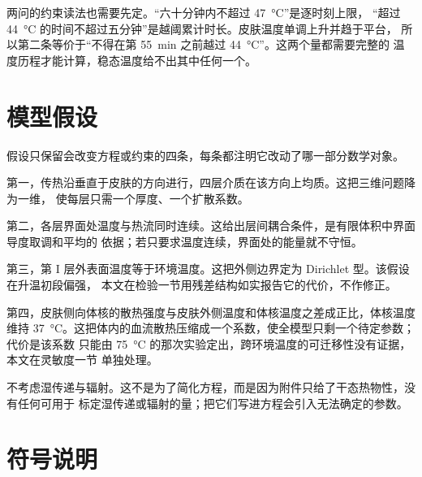 \documentclass[withoutpreface,bwprint]{cumcmthesis}
\begin{document}
两问的约束读法也需要先定。“六十分钟内不超过 \SI{47}{\celsius}”是逐时刻上限，
“超过 \SI{44}{\celsius} 的时间不超过五分钟”是越阈累计时长。皮肤温度单调上升并趋于平台，
所以第二条等价于“不得在第 \SI{55}{min} 之前越过 \SI{44}{\celsius}”。这两个量都需要完整的
温度历程才能计算，稳态温度给不出其中任何一个。

\section{模型假设}

假设只保留会改变方程或约束的四条，每条都注明它改动了哪一部分数学对象。

第一，传热沿垂直于皮肤的方向进行，四层介质在该方向上均质。这把三维问题降为一维，
使每层只需一个厚度、一个扩散系数。

第二，各层界面处温度与热流同时连续。这给出层间耦合条件，是有限体积中界面导度取调和平均的
依据；若只要求温度连续，界面处的能量就不守恒。

第三，第 I 层外表面温度等于环境温度。这把外侧边界定为 Dirichlet 型。该假设在升温初段偏强，
本文在检验一节用残差结构如实报告它的代价，不作修正。

第四，皮肤侧向体核的散热强度与皮肤外侧温度和体核温度之差成正比，体核温度维持
\SI{37}{\celsius}。这把体内的血流散热压缩成一个系数，使全模型只剩一个待定参数；代价是该系数
只能由 \SI{75}{\celsius} 的那次实验定出，跨环境温度的可迁移性没有证据，本文在灵敏度一节
单独处理。

不考虑湿传递与辐射。这不是为了简化方程，而是因为附件只给了干态热物性，没有任何可用于
标定湿传递或辐射的量；把它们写进方程会引入无法确定的参数。

\section{符号说明}
\end{document}
